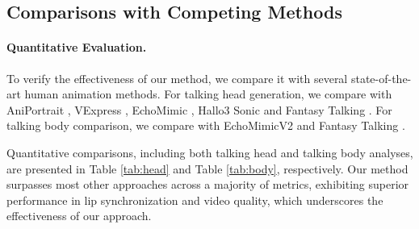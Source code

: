 \documentclass{article}
\begin{document}
\begin{table}[]
\centering
\caption{Quantitative comparison with other competing methods on talking body generation, including EMTD dataset.}
\setlength\tabcolsep{13pt}
\label{tab:body}
\end{table}


\subsection{Comparisons with Competing Methods}

\paragraph{Quantitative Evaluation.}
To verify the effectiveness of our method, we compare it with several state-of-the-art human animation methods. For talking head generation, we compare with AniPortrait \cite{wei2024aniportrait}, VExpress \cite{wang2024v}, EchoMimic \cite{chen2025echomimic}, Hallo3 \cite{cui2024hallo3} Sonic \cite{ji2024sonic} and Fantasy Talking \cite{wang2025fantasytalking}. For talking body comparison, we compare with EchoMimicV2 \cite{meng2024echomimicv2} and Fantasy Talking \cite{wang2025fantasytalking}.

Quantitative comparisons, including both talking head and talking body analyses, are presented in Table \ref{tab:head} and Table \ref{tab:body}, respectively. Our method surpasses most other approaches across a majority of metrics, exhibiting superior performance in lip synchronization and video quality, which underscores the effectiveness of our approach.
\end{document}
